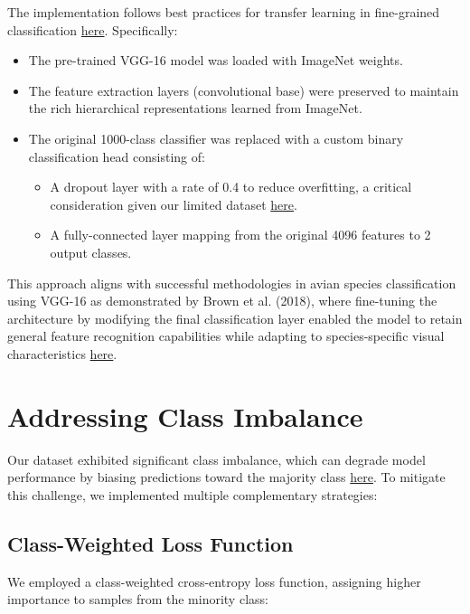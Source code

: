 \documentclass[a4paper,12pt]{article}
\begin{document}

The implementation follows best practices for transfer learning in fine-grained classification \href{https://openaccess.thecvf.com/content_CVPR_2019/papers/Kornblith_Do_Better_ImageNet_Models_Transfer_Better_CVPR_2019_paper.pdf}{here}. Specifically:
\begin{itemize}
    \item The pre-trained VGG-16 model was loaded with ImageNet weights.
    \item The feature extraction layers (convolutional base) were preserved to maintain the rich hierarchical representations learned from ImageNet.
    \item The original 1000-class classifier was replaced with a custom binary classification head consisting of: 
    \begin{itemize}
        \item A dropout layer with a rate of 0.4 to reduce overfitting, a critical consideration given our limited dataset \href{https://www.jmlr.org/papers/volume15/srivastava14a/srivastava14a.pdf}{here}.
        \item A fully-connected layer mapping from the original 4096 features to 2 output classes.
    \end{itemize}
\end{itemize}

This approach aligns with successful methodologies in avian species classification using VGG-16 as demonstrated by Brown et al. (2018), where fine-tuning the architecture by modifying the final classification layer enabled the model to retain general feature recognition capabilities while adapting to species-specific visual characteristics \href{https://ieeexplore.ieee.org/stamp/stamp.jsp?tp=&arnumber=10533638&tag=}{here}.


\section{Addressing Class Imbalance}

Our dataset exhibited significant class imbalance, which can degrade model performance by biasing predictions toward the majority class \href{https://journalofbigdata.springeropen.com/articles/10.1186/s40537-019-0192-5}{here}. To mitigate this challenge, we implemented multiple complementary strategies:

\subsection{Class-Weighted Loss Function}
We employed a class-weighted cross-entropy loss function, assigning higher importance to samples from the minority class:
\end{document}
